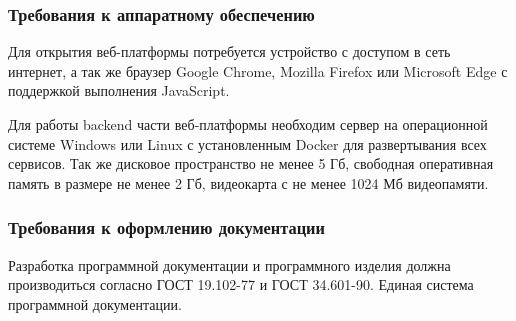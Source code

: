 \subsubsection{Требования к аппаратному обеспечению}

Для открытия веб-платформы потребуется устройство с доступом в сеть интернет, а так же браузер Google Chrome, Mozilla Firefox или Microsoft Edge с поддержкой выполнения JavaScript.

Для работы backend части веб-платформы необходим сервер на операционной системе Windows или Linux с установленным Docker для развертывания всех сервисов. Так же дисковое пространство не менее 5 Гб, свободная оперативная память в размере не менее 2 Гб, видеокарта с не менее 1024 Мб видеопамяти.

\subsubsection{Требования к оформлению документации}

Разработка программной документации и программного изделия должна производиться согласно ГОСТ 19.102-77 и ГОСТ 34.601-90. Единая система программной документации.
